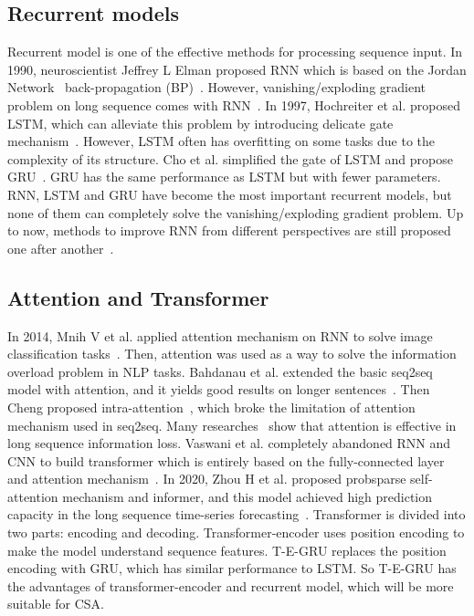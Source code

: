 \subsection{Recurrent models}
Recurrent model is one of the effective methods for processing sequence input. In 1990, neuroscientist Jeffrey L Elman proposed RNN which is based on the Jordan Network~\cite{preRNN} back-propagation (BP)~\cite{BP}. However, vanishing/exploding gradient problem on long sequence comes with RNN~\cite{bengio1994Long-term-dependencies-diffcult}. In 1997, Hochreiter et al. proposed LSTM, which can alleviate 
this problem by introducing delicate gate mechanism~\cite{hochreiter1997LSTM}. However, LSTM often has overfitting on some tasks due to the complexity of its structure. Cho et al. simplified the gate of LSTM and propose GRU~\cite{cho2014learningGRU}. GRU has the same performance as LSTM but with fewer parameters. RNN, LSTM and GRU have become the most important recurrent models, but none of them can completely solve the vanishing/exploding gradient problem. Up to now, methods to improve RNN from different perspectives are still proposed one after another~\cite{liu2021selfish}.


\subsection{Attention and Transformer}
In 2014, Mnih V et al. applied attention mechanism on RNN to solve image classification tasks~\cite{cv_Att}. Then, attention was used as a way to solve the information overload problem in NLP tasks. Bahdanau et al. extended the basic seq2seq model with attention, and it yields good results on longer sentences~\cite{bahdanau2014Attention-first}. Then Cheng proposed intra-attention~\cite{Att-breakout-Seq2seq}, which broke the limitation of attention mechanism used in seq2seq. Many researches~\cite{bahdanau2014Attention-first,Att-breakout-Seq2seq,cv_Att,RecurrentAttNet-AspectSentimentAnalysis} show that attention is effective in long sequence information loss. Vaswani et al. completely abandoned RNN and CNN to build transformer which is entirely based on the fully-connected layer and attention mechanism~\cite{vaswani2017Transformer}. In 2020, Zhou H et al. proposed probsparse self-attention mechanism and informer, and this model achieved high prediction capacity in the long sequence time-series forecasting~\cite{zhou2020informer}. Transformer is divided into two parts: encoding and decoding. Transformer-encoder uses position encoding to make the model understand sequence features. T-E-GRU replaces the position encoding with GRU, which has similar performance to LSTM. So T-E-GRU has the advantages of transformer-encoder and recurrent model, which will be more suitable for CSA.

